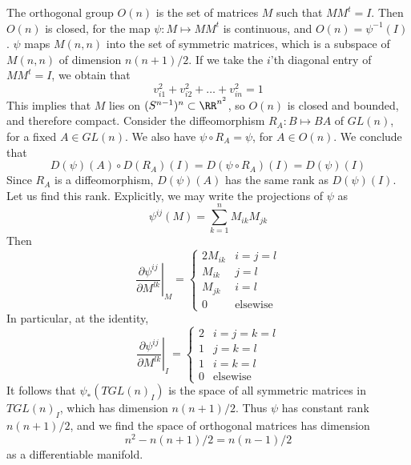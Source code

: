 \begin{example}
    The orthogonal group $O(n)$ is the set of matrices $M$ such that $MM^t = I$. Then $O(n)$ is closed, for the map $\psi: M \mapsto MM^t$ is continuous, and $O(n) = \psi^{-1}(I)$. $\psi$ maps $M(n,n)$ into the set of symmetric matrices, which is a subspace of $M(n,n)$ of dimension $n(n+1)/2$. If we take the $i$'th diagonal entry of $MM^t = I$, we obtain that
    \[ v_{i1}^2 + v_{i2}^2 + \dots + v_{in}^2 = 1 \]
    This implies that $M$ lies on $(S^{n-1})^n \subset \RR^{n^2}$, so $O(n)$ is closed and bounded, and therefore compact. Consider the diffeomorphism $R_A: B \mapsto BA$ of $GL(n)$, for a fixed $A \in GL(n)$. We also have $\psi \circ R_A = \psi$, for $A \in O(n)$. We conclude that
    \[ D(\psi)(A) \circ D(R_A)(I) = D(\psi \circ R_A)(I) = D(\psi)(I) \]
    Since $R_A$ is a diffeomorphism, $D(\psi)(A)$ has the same rank as $D(\psi)(I)$. Let us find this rank. Explicitly, we may write the projections of $\psi$ as
    \[ \psi^{ij}(M) = \sum_{k = 1}^n M_{ik}M_{jk} \]
    Then
    \[ \left.\frac{\partial \psi^{ij}}{\partial M^{lk}}\right|_M = \begin{cases} 2 M_{ik} & i = j = l \\ M_{ik} & j = l \\ M_{jk} & i = l \\ 0 & \text{elsewise} \end{cases} \]
    In particular, at the identity,
    \[ \left.\frac{\partial \psi^{ij}}{\partial M^{lk}}\right|_I = \begin{cases} 2 & i = j = k = l \\ 1 & j = k = l \\ 1 & i = k = l \\ 0 & \text{elsewise} \end{cases} \]
    It follows that $\psi_*(TGL(n)_I)$ is the space of all symmetric matrices in $TGL(n)_I$, which has dimension $n(n+1)/2$. Thus $\psi$ has constant rank $n(n+1)/2$, and we find the space of orthogonal matrices has dimension
    \[ n^2 - n(n+1)/2 = n(n-1)/2 \]
    as a differentiable manifold.
\end{example}

